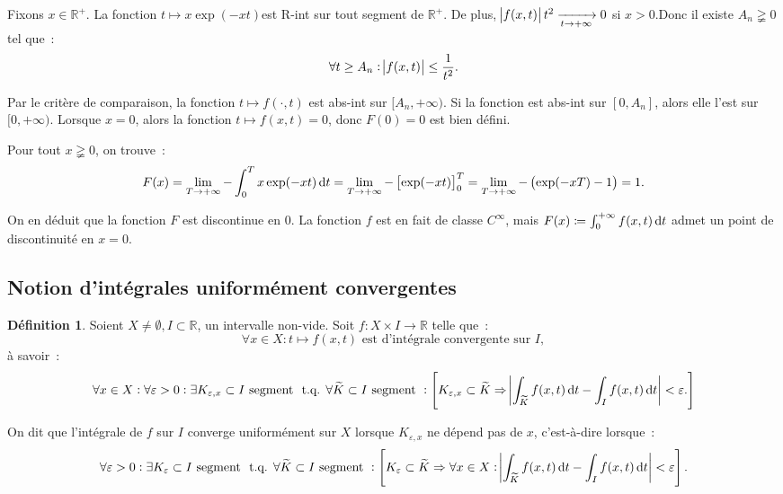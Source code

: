 \documentclass{report}
\theoremstyle{definition}
\newtheorem{déf}[thm]{Définition}
\theoremstyle{remark}
\newcommand{\R}{\mathbb R}
\newcommand{\Rp}{\R^{+}}
\newcommand{\tq}{\text{ t.q. }}
\newcommand{\pinfty}{{+\infty}}
\begin{document}
			Fixons $x \in \Rp$. La fonction $t \mapsto x\exp(-xt)$est R-int sur tout segment de $\Rp$. De plus, $\abs {f(x, t)}t^2 \xrightarrow[t \to \pinfty]{} 0$
			si $x > 0$.Donc il existe $A_n \gneqq 0$ tel que~:
			\[\forall t \geq A_n : \abs {f(x, t)} \leq \frac 1{t^2}.\]

			Par le critère de comparaison, la fonction $t \mapsto f(\cdot, t)$ est abs-int sur $[A_n, \pinfty)$. Si la fonction est abs-int sur $[0, A_n]$, alors
			elle l'est sur $[0, \pinfty)$. Lorsque $x = 0$, alors la fonction $t \mapsto f(x, t) = 0$, donc $F(0) = 0$ est bien défini.

			Pour tout $x \gneqq 0$, on trouve~:
			\[F(x) = \lim_{T \to \pinfty}-\int_0^Tx\exp(-xt)\dif t = \lim_{T \to \pinfty}-\left[\exp(-xt)\right]_0^T
				= \lim_{T \to \pinfty} -\left(\exp(-xT) - 1\right) = 1.\]

			On en déduit que la fonction $F$ est discontinue en $0$. La fonction $f$ est en fait de classe $C^\infty$, mais
			$F(x) \coloneqq \int_0^\pinfty f(x, t)\dif t$ admet un point de discontinuité en $x = 0$.

		\subsection{Notion d'intégrales uniformément convergentes}
			\begin{déf} Soient $X \neq \emptyset, I \subset \R$, un intervalle non-vide. Soit $f : X \times I \to \R$ telle que~:
			\[\forall x \in X : t \mapsto f(x, t) \text{ est d'intégrale convergente sur } I,\]
			à savoir~:
			\[\forall x \in X : \forall \varepsilon > 0 : \exists K_{\varepsilon, x} \subset I \text{ segment } \tq
				\forall \widetilde K \subset I \text{ segment } :
					\left[K_{\varepsilon, x} \subset \widetilde K \Rightarrow \abs {\int_{\widetilde K}f(x, t)\dif t - \int_If(x, t)\dif t} < \varepsilon.\right]\]

			On dit que l'intégrale de $f$ sur $I$ converge uniformément sur $X$ lorsque $K_{\varepsilon, x}$ ne dépend pas de $x$, c'est-à-dire lorsque~:
			\[\forall \varepsilon > 0 : \exists K_\varepsilon \subset I \text{ segment } \tq \forall \widetilde K \subset I \text{ segment } :
				\left[K_\varepsilon \subset \widetilde K \Rightarrow
					\forall x \in X : \abs {\int_{\widetilde K}f(x, t)\dif t - \int_I f(x, t)\dif t} < \varepsilon\right].\]
			\end{déf}
\end{document}
